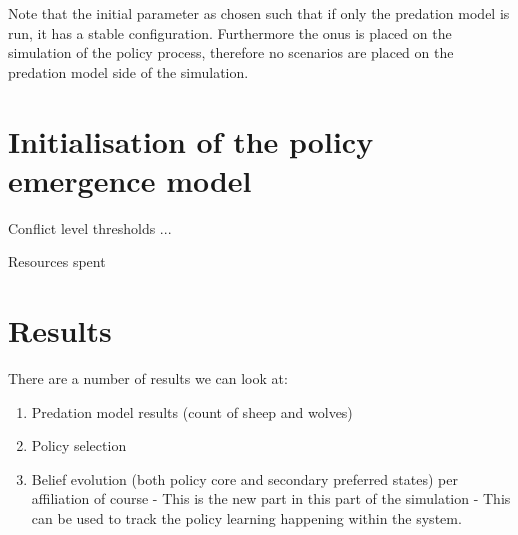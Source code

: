 \documentclass[12pt]{article}
\begin{document}
Note that the initial parameter as chosen such that if only the predation model is run, it has a stable configuration. Furthermore the onus is placed on the simulation of the policy process, therefore no scenarios are placed on the predation model side of the simulation.


\section{Initialisation of the policy emergence model}
\label{sec:}

Conflict level thresholds ...

Resources spent


\section{Results}
\label{sec:}

There are a number of results we can look at:

\begin{enumerate}
\item Predation model results (count of sheep and wolves)
\item Policy selection
\item Belief evolution (both policy core and secondary preferred states) per affiliation of course - This is the new part in this part of the simulation - This can be used to track the policy learning happening within the system.
\end{enumerate}



 

\end{document}
